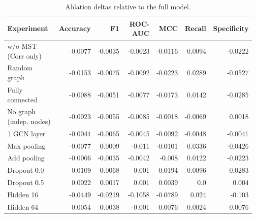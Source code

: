 \begin{table}[t]
\centering
\caption{Ablation deltas relative to the full model.}
\label{tab:ablation_delta}
\footnotesize
\begin{tabular}{lrrrrrr}
\toprule
Experiment & Accuracy & F1 & ROC-AUC & MCC & Recall & Specificity \\
\midrule
w/o MST (Corr only) & -0.0077 & -0.0035 & -0.0023 & -0.0116 & 0.0094 & -0.0222 \\
Random graph & -0.0153 & -0.0075 & -0.0092 & -0.0223 & 0.0289 & -0.0527 \\
Fully connected & -0.0088 & -0.0051 & -0.0077 & -0.0173 & 0.0142 & -0.0285 \\
No graph (indep. nodes) & -0.0023 & -0.0055 & -0.0085 & -0.0018 & -0.0069 & 0.0018 \\
1 GCN layer & -0.0044 & -0.0065 & -0.0045 & -0.0092 & -0.0048 & -0.0041 \\
Max pooling & -0.0077 & 0.0009 & -0.011 & -0.0101 & 0.0336 & -0.0426 \\
Add pooling & -0.0066 & -0.0035 & -0.0042 & -0.008 & 0.0122 & -0.0223 \\
Dropout 0.0 & 0.0109 & 0.0068 & -0.001 & 0.0194 & -0.0096 & 0.0283 \\
Dropout 0.5 & 0.0022 & 0.0017 & 0.001 & 0.0039 & 0.0 & 0.004 \\
Hidden 16 & -0.0449 & -0.0219 & -0.1058 & -0.0789 & 0.024 & -0.103 \\
Hidden 64 & 0.0054 & 0.0038 & -0.001 & 0.0076 & 0.0024 & 0.0076 \\
\bottomrule
\end{tabular}
\end{table}
